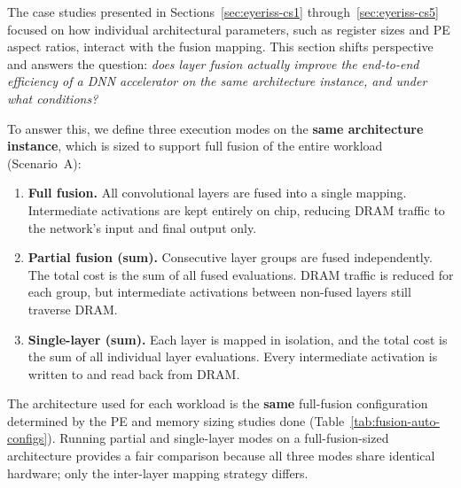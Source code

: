 The case studies presented in Sections~\ref{sec:eyeriss-cs1}
through~\ref{sec:eyeriss-cs5} focused on how individual
architectural parameters, such as register sizes and PE aspect
ratios, interact with the fusion mapping.
This section shifts perspective and answers the question:
\emph{does layer fusion actually improve the end-to-end efficiency
of a DNN accelerator on the same architecture instance, and under what conditions?}

To answer this, we define three execution modes on the \textbf{same
architecture instance}, which is sized to support full fusion of the
entire workload (Scenario~A):
\begin{enumerate}
  \item \textbf{Full fusion.}
        All convolutional layers are fused into a single mapping.
        Intermediate activations are kept entirely on chip, reducing
        DRAM traffic to the network's input and final output only.
  \item \textbf{Partial fusion (sum).}
        Consecutive layer groups are fused independently.
        The total cost is the sum of all fused evaluations.
        DRAM traffic is reduced for each group, but intermediate
        activations between non-fused layers still traverse DRAM.
  \item \textbf{Single-layer (sum).}
        Each layer is mapped in isolation, and the total cost is
        the sum of all individual layer evaluations.
        Every intermediate activation is written to and read back
        from DRAM.
\end{enumerate}

The architecture used for each workload is the \textbf{same} full-fusion
configuration determined by the PE and memory sizing studies done
(Table~\ref{tab:fusion-auto-configs}).
Running partial and single-layer modes on a full-fusion-sized
architecture provides a fair comparison because all three modes
share identical hardware; only the inter-layer mapping
strategy differs.

